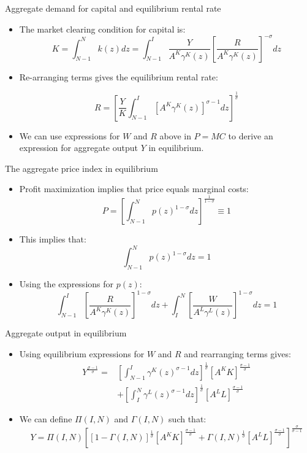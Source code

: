 \documentclass[notes=show]{beamer}
\begin{document}
\begin{frame}{Aggregate demand for capital and equilibrium rental rate}
\begin{itemize}
\item The market clearing condition for capital is:
\[
K = \int_{N-1}^{N} k(z)dz =  \int_{N-1}^{I} \frac{Y}{A^{K}\gamma^{K}(z)} \left[ \frac{R}{A^{K}\gamma^{K}(z)} \right]^{- \sigma} dz
\]
\item Re-arranging terms gives the equilibrium rental rate:
\begin{tcolorbox}
\[
R = \left[ \frac{Y}{K} \int_{N-1}^{I} [A^{K}\gamma^{K}(z)]^{\sigma-1} dz \right]^{\frac{1}{\sigma}}
\]
\end{tcolorbox}
\item We can use expressions for $W$ and $R$ above in $P=MC$ to derive an expression for aggregate output $Y$ in equilibrium.
\end{itemize}
\end{frame}

\begin{frame}{The aggregate price index in equilibrium}
\begin{itemize}
\item Profit maximization implies that price equals marginal costs:
\[
P = \left[ \int_{N-1}^{N} p(z)^{1-\sigma} dz \right]^{\frac{1}{1- \sigma}}  \equiv 1
\]
\item This implies that:
\[
\int_{N-1}^{N} p(z)^{1-\sigma} dz = 1
\]
\item Using the expressions for $p(z)$:
 \[
\int_{N-1}^{I} \left[\frac{R}{A^{K} \gamma^{K}(z)} \right]^{1-\sigma} dz + \int_{I}^{N} \left[ \frac{W}{A^{L} \gamma^{L}(z)} \right]^{1-\sigma} dz = 1
\]
\end{itemize}
\end{frame}

\begin{frame}{Aggregate output in equilibrium}
\begin{itemize}
\item Using equilibrium expressions for $W$ and $R$ and rearranging terms gives:
\begin{align*}
Y^{\frac{\sigma-1}{\sigma}} = & \left[ \int_{N-1}^{I} \gamma^{K}(z)^{\sigma-1} dz \right]^{\frac{1}{\sigma}} [A^{K}K]^{\frac{\sigma -1}{\sigma}} \\
& + \left[ \int_{I}^{N} \gamma^{L}(z)^{\sigma-1} dz \right]^{\frac{1}{\sigma}} [A^{L}L]^{\frac{\sigma -1}{\sigma}} \tag{A2} \label{eqA2}
\end{align*}
\item We can define $\Pi(I,N)$ and $\Gamma(I,N)$ such that:
\[
Y= \Pi(I,N) \left[ [1- \Gamma(I,N)]^{\frac{1}{\sigma}} [A^{K}K]^{\frac{\sigma -1}{\sigma}} + \Gamma(I,N)^{\frac{1}{\sigma}} [A^{L}L]^{\frac{\sigma -1}{\sigma}} \right]^{\frac{\sigma}{\sigma-1}} 
\]
\end{itemize}
\end{frame}
\end{document}
